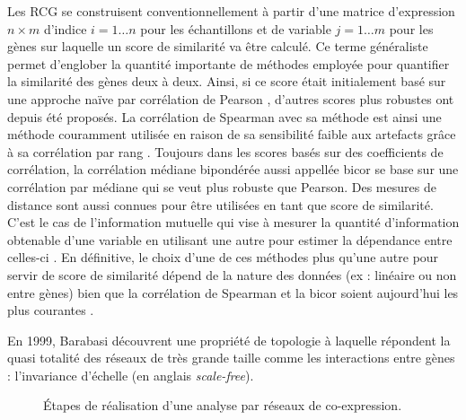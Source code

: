 Les RCG se construisent conventionnellement à partir d'une matrice d'expression $n \times m$ d'indice $i = 1 … n$ pour les échantillons et de variable $j = 1 … m$ pour les gènes sur laquelle un score de similarité va être calculé. Ce terme généraliste permet d'englober la quantité importante de méthodes employée pour quantifier la similarité des gènes deux à deux. Ainsi, si ce score était initialement basé sur une approche naïve par corrélation de Pearson \cite{Carter2004}, d'autres scores plus robustes ont depuis été proposés. La corrélation de Spearman avec sa méthode est ainsi une méthode couramment utilisée en raison de sa sensibilité faible aux artefacts grâce à sa corrélation par rang \cite{Chowdhury2019,Serin2016,Kuehne2017}. Toujours dans les scores basés sur des coefficients de corrélation, la corrélation médiane bipondérée aussi appellée bicor \cite{Song2012} se base sur une corrélation par médiane qui se veut plus robuste que Pearson. Des mesures de distance sont aussi connues pour être utilisées en tant que score de similarité. C'est le cas de l'information mutuelle qui vise à mesurer la quantité d'information obtenable d'une variable en utilisant une autre pour estimer la dépendance entre celles-ci \cite{Kullback1997}. En définitive, le choix d'une de ces méthodes plus qu'une autre pour servir de score de similarité dépend de la nature des données (ex : linéaire ou non entre gènes) bien que la corrélation de Spearman et la bicor soient aujourd'hui les plus courantes \cite{Serin2016}.


En 1999, Barabasi découvrent une propriété de topologie à laquelle répondent la quasi totalité des réseaux de très grande taille comme les interactions entre gènes : l'invariance d'échelle (en anglais \textit{scale-free}).



\begin{figure}
    \centering
    \caption{Étapes de réalisation d'une analyse par réseaux de co-expression.}
    \label{fig:coexpr_pipeline}
\end{figure}


